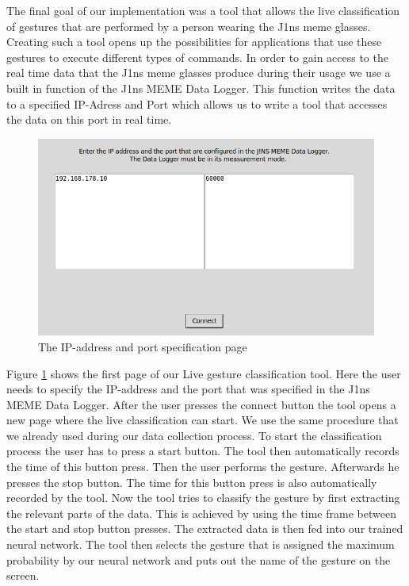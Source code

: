 \documentclass[runningheads]{llncs}
\begin{document}
The final goal of our implementation was a tool that allows the live classification of gestures that are performed by a person wearing the J1ns meme glasses. Creating such a tool opens up the possibilities for applications that use these gestures to execute different types of commands. In order to gain access to the real time data that the J1ns meme glasses produce during their usage we use a built in function of the J1ns MEME Data Logger. This function writes the data to a specified IP-Adress and Port which allows us to write a tool that accesses the data on this port in real time.
\begin{figure}
\centering
\includegraphics[width=\textwidth]{Live_Classification_IP.png}
\caption{The IP-address and port specification page}
\label{fig:ipandport}
\end{figure}
Figure \ref{fig:ipandport} shows the first page of our Live gesture classification tool. Here the user needs to specify the IP-address and the port that was specified in the J1ns MEME Data Logger. After the user presses the connect button the tool opens a new page where the live classification can start. We use the same procedure that we already used during our data collection process. To start the classification process the user has to press a start button. The tool then automatically records the time of this button press. Then the user performs the gesture. Afterwards he presses the stop button. The time for this button press is also automatically recorded by the tool. Now the tool tries to classify the gesture by first extracting the relevant parts of the data. This is achieved by using the time frame between the start and stop button presses. The extracted data is then fed into our trained neural network. The tool then selects the gesture that is assigned the maximum probability by our neural network and puts out the name of the gesture on the screen.
\end{document}

